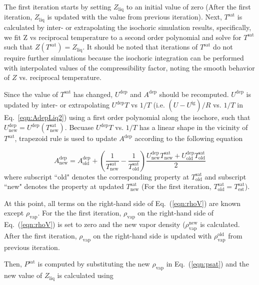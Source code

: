 \documentclass[5p,times]{elsarticle}
\begin{document}
The first iteration starts by setting $Z_\mathrm{liq}$ to an initial value of zero (After the first iteration, $Z_\mathrm{liq}$ is updated with the value from previous iteration). Next, $T^\mathrm{sat}$ is calculated by inter- or extrapolating the isochoric simulation results, specifically, we fit Z vs reciprocal temperature to a second order polynomial and solve for $T^\mathrm{sat}$ such that $Z(T^\mathrm{sat})=Z_\mathrm{liq}$. It should be noted that iterations of $T^\mathrm{sat}$ do not require further simulations because the isochoric integration can be performed with interpolated values of the compressibility factor, noting the smooth behavior of $Z$ vs. reciprocal temperature.

Since the value of $T^\mathrm{sat}$ has changed, $U^\mathrm{dep}$ and $A^\mathrm{dep}$ should be recomputed. $U^\mathrm{dep}$ is updated by inter- or extrapolating $U^\mathrm{dep}T$ vs $1/T$ (i.e. $(U-U^\mathrm{ig})/R$ vs. $1/T$ in Eq.~\ref{eqn:AdepLiq2}) using a first order polynomial along the isochore, such that $U^\mathrm{dep}_\mathrm{new} = U^\mathrm{dep}(T^\mathrm{sat}_\mathrm{new})$. Becuase $U^\mathrm{dep}T$ vs. $1/T$ has a linear shape in the vicinity of $T^\mathrm{sat}$, trapezoid rule is used to update $A^\mathrm{dep}$ according to the following equation

\begin{equation}
A^\mathrm{dep}_\mathrm{new} = A^\mathrm{dep}_\mathrm{old} + \left( \frac{1}{T^\mathrm{sat}_\mathrm{new}}-\frac{1}{T^\mathrm{sat}_\mathrm{old}} \right) \frac{U^\mathrm{dep}_\mathrm{new}T^\mathrm{sat}_\mathrm{new}+U^\mathrm{dep}_\mathrm{old}T^\mathrm{sat}_\mathrm{old}}{2} 
\label{eqn:aDepCorrection}
\end{equation}
where subscript ``old" denotes the corresponding property at $T^\mathrm{sat}_\mathrm{old}$ and subscript ``new" denotes the property at updated $T^\mathrm{sat}_\mathrm{new}$ (For the first iteration, $T^\mathrm{sat}_\mathrm{old} = T^\mathrm{sat}_\mathrm{est}$). 

At this point, all terms on the right-hand side of Eq.~(\ref{eqn:rhoV}) are known except $\rho_\mathrm{vap}$. For the the first iteration, $\rho_\mathrm{vap}$ on the right-hand side of Eq.~(\ref{eqn:rhoV}) is set to zero and the new vapor density ($\rho_\mathrm{vap}^\mathrm{new}$ is calculated. After the first iteration, $\rho_\mathrm{vap}$ on the right-hand side is updated with $\rho_\mathrm{vap}^\mathrm{old}$ from previous iteration. 

Then, $P^\mathrm{sat}$ is computed by substituting the new $\rho_\mathrm{vap}$ in Eq.~(\ref{eqn:psat}) and the new value of $Z_\mathrm{liq}$ is calculated using
\end{document}
